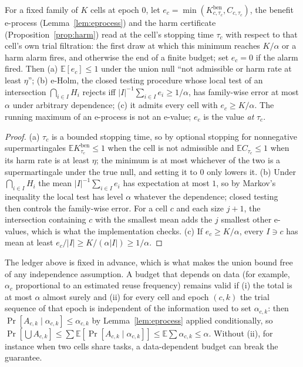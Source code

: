 \begin{proposition}\label{rem:eholm}
For a fixed family of $K$ cells at epoch $0$, let $e_c=\min(K^{\mathrm{ben}}_{c,\tau_c},C_{c,\tau_c})$, the benefit e-process
(Lemma~\ref{lem:eprocess}) and the harm certificate (Proposition~\ref{prop:harm}) read at the cell's stopping time $\tau_c$ with respect to that cell's own trial filtration: the first
draw at which this minimum reaches $K/\alpha$ or a harm alarm fires, and otherwise the end of a finite budget; set $e_c=0$ if the alarm
fired.  Then (a) $\mathbb{E}[e_c]\le1$ under the union null ``not admissible or harm rate at least $\eta$''; (b) e-Holm, the closed
testing procedure whose local test of an intersection $\bigcap_{i\in I}H_i$ rejects iff $|I|^{-1}\sum_{i\in I}e_i\ge1/\alpha$, has
family-wise error at most $\alpha$ under arbitrary dependence; (c) it admits every cell with $e_c\ge K/\alpha$.  The running maximum
of an e-process is not an e-value; $e_c$ is the value \emph{at} $\tau_c$.
\end{proposition}

\begin{proof}
(a) $\tau_c$ is a bounded stopping time, so by optional stopping for nonnegative supermartingales
$\mathbb{E}K^{\mathrm{ben}}_{\tau_c}\le1$ when the cell is not admissible and $\mathbb{E}C_{\tau_c}\le1$ when its harm rate is at least
$\eta$; the minimum is at most whichever of the two is a supermartingale under the true null, and setting it to $0$ only lowers it.
(b) Under $\bigcap_{i\in I}H_i$ the mean $|I|^{-1}\sum_{i\in I}e_i$ has expectation at most $1$, so by Markov's inequality the local test
has level $\alpha$ whatever the dependence; closed testing~\cite{vovk2021evalues} then controls the family-wise error.  For a cell $c$
and each size $j+1$, the intersection containing $c$ with the smallest mean adds the $j$ smallest other e-values, which is what the
implementation checks.  (c) If $e_c\ge K/\alpha$, every $I\ni c$ has mean at least $e_c/|I|\ge K/(\alpha|I|)\ge1/\alpha$.
\end{proof}

\begin{remark}
The ledger above is fixed in advance, which is what makes the union bound free of any independence assumption.  A budget that
depends on data (for example, $\alpha_c$ proportional to an estimated reuse frequency) remains valid if (i) the total is at most
$\alpha$ almost surely and (ii) for every cell and epoch $(c,k)$ the trial sequence of that epoch is independent of the information used to set
$\alpha_{c,k}$: then
$\Pr[A_{c,k}\mid\alpha_{c,k}]\le\alpha_{c,k}$ by Lemma~\ref{lem:eprocess} applied conditionally, so
$\Pr[\bigcup A_{c,k}]\le\sum\mathbb{E}[\Pr[A_{c,k}\mid\alpha_{c,k}]]\le\mathbb{E}\sum\alpha_{c,k}\le\alpha$.  Without (ii), for instance when two
cells share tasks, a data-dependent budget can break the guarantee.
\end{remark}


